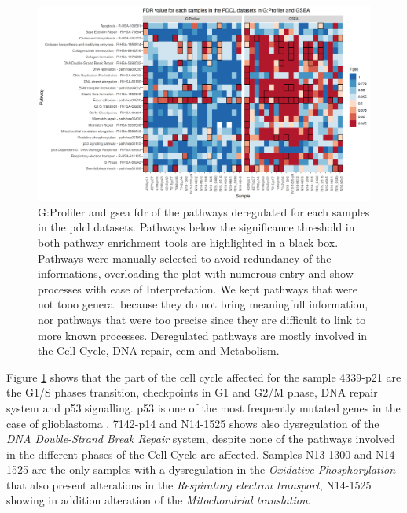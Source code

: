 \begin{figure}
    \includegraphics[width=\textwidth]{img/heatmap-fdr-pathway}
    \caption{
        G:Profiler and \acrshort{gsea} \acrfull{fdr} of the pathways deregulated for each samples in the \acrshort{pdcl} datasets.
        Pathways below the significance threshold in both pathway enrichment tools are highlighted in a black box.
        Pathways were manually selected to avoid redundancy of the informations, overloading the plot with numerous entry and show processes with ease of Interpretation.
        We kept pathways that were not tooo general because they do not bring meaningfull information, nor pathways that were too precise since they are difficult to link to more known processes.        
        Deregulated pathways are mostly involved in the Cell-Cycle, DNA repair, \acrlong{ecm} and Metabolism.
    }
    \label{fig:heatmap-fdr-pathway}
\end{figure}

Figure \ref*{fig:heatmap-fdr-pathway} shows that the part of the cell cycle affected for the sample 4339-p21 are the G1/S phases transition, checkpoints in G1 and G2/M phase, DNA repair system and p53 signalling.
p53 is one of the most frequently mutated genes in the case of glioblastoma \cite*{McLendon2008}.
7142-p14 and N14-1525 shows also dysregulation of the \textit{DNA Double-Strand Break Repair} system, despite none of the pathways involved in the different phases of the Cell Cycle are affected.
Samples N13-1300 and N14-1525 are the only samples with a dysregulation in the \textit{Oxidative Phosphorylation} that also present alterations in the \textit{Respiratory electron transport}, N14-1525 showing in addition alteration of the \textit{Mitochondrial translation}.
